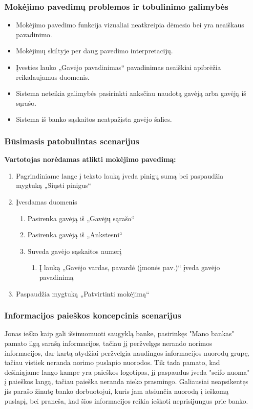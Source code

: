 \documentclass{VUMIFPSkursinis}
\begin{document}
\subsubsection{Mokėjimo pavedimų problemos ir tobulinimo galimybės}
\begin{itemize}
	\item Mokėjimo pavedimo funkcija vizualiai neatkreipia dėmesio bei yra neaiškaus pavadinimo.
	\item Mokėjimų skiltyje per daug pavedimo interpretacijų.
	\item Įvesties lauko „Gavėjo pavadinimas“ pavadinimas neaiškiai apibrėžia reikalaujamus duomenis.
	\item Sistema neteikia galimybės pasirinkti anksčiau naudotą gavėją arba gavėją iš sąrašo.
	\item Sistema iš banko sąskaitos neatpažįsta gavėjo šalies.
\end{itemize}
\subsubsection{Būsimasis patobulintas scenarijus}
\begin{center}
\textbf{Vartotojas norėdamas atlikti mokėjimo pavedimą:}
\end{center}
\begin{enumerate}
	\item Pagrindiniame lange į teksto lauką įveda pinigų sumą bei paspaudžia mygtuką „Siųsti pinigus“
	\item Įvesdamas duomenis
	\begin{enumerate}
		\item Pasirenka gavėją iš „Gavėjų sąrašo“
		\item Pasirenka gavėją iš „Ankstesni“
		\item Suveda gavėjo sąskaitos numerį
		\begin{enumerate}
			\item Į lauką „Gavėjo vardas, pavardė (įmonės pav.)“ įveda gavėjo pavadinimą
		\end{enumerate}
	\end{enumerate}
	\item Paspaudžia mygtuką „Patvirtinti mokėjimą“
\end{enumerate}
\subsubsection{Informacijos paieškos koncepcinis scenarijus}
Jonas ieško kaip gali išsinuomuoti saugyklą banke, pasirinkęs "Mano bankas" pamato ilgą sarašą informacijos, tačiau jį peržvelgęs nerando norimos informacijos, dar kartą atydžiai peržvelgia naudingos informacijos nuorodų grupę, tačiau vistiek neranda norimo puslapio nuorodos. Tik tada pamato, kad dešiniąjame lango kampe yra paieškos logotipas, jį paspaudus įveda "seifo nuoma" į paieškos langą, tačiau paieška neranda nieko prasmingo. Galiausiai neapsikentęs jis parašo žinutę banko dorbuotojui, kuris jam atsiunčia nuorodą į ieškomą puslapį, bei praneša, kad šios informacijos reikia ieškoti neprisijungus prie banko. 
\end{document}
